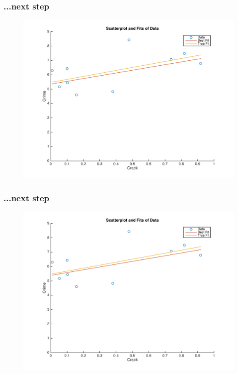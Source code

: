 \documentclass{beamer}
\begin{document}
\begin{frame}
\frametitle[alignment=center]{...next step}
\begin{figure}
\centering
\includegraphics[scale=0.5]{Newton_OLS_Figure_16.png}
\end{figure}
\end{frame}

\begin{frame}
\frametitle[alignment=center]{...next step}
\begin{figure}
\centering
\includegraphics[scale=0.5]{Newton_OLS_Figure_17.png}
\end{figure}
\end{frame}
\end{document}
